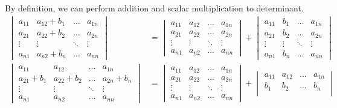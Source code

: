\documentclass{huhtakm-template-book}
\begin{document}
\begin{defn}
    By definition, we can perform addition and scalar multiplication to determinant.
    \begin{align*}
        \begin{vmatrix}
            a_{11} & a_{12}+b_{1} & \hdots & a_{1n}\\
            a_{21} & a_{22}+b_{2} & \hdots & a_{2n}\\
            \vdots & \vdots & \ddots & \vdots\\
            a_{n1} & a_{n2}+b_{n} & \hdots & a_{nn}
        \end{vmatrix}&=\begin{vmatrix}
            a_{11} & a_{12} & \hdots & a_{1n}\\
            a_{21} & a_{22} & \hdots & a_{2n}\\
            \vdots & \vdots & \ddots & \vdots\\
            a_{n1} & a_{n2} & \hdots & a_{nn}
        \end{vmatrix}+\begin{vmatrix}
            a_{11} & b_{1} & \hdots & a_{1n}\\
            a_{21} & b_{2} & \hdots & a_{2n}\\
            \vdots & \vdots & \ddots & \vdots\\
            a_{n1} & b_{n} & \hdots & a_{nn}
        \end{vmatrix}\\
        \begin{vmatrix}
            a_{11} & a_{12} & \hdots & a_{1n}\\
            a_{21}+b_{1} & a_{22}+b_{2} & \hdots & a_{2n}+b_{n}\\
            \vdots & \vdots & \ddots & \vdots\\
            a_{n1} & a_{n2} & \hdots & a_{nn}
        \end{vmatrix}&=\begin{vmatrix}
            a_{11} & a_{12} & \hdots & a_{1n}\\
            a_{21} & a_{22} & \hdots & a_{2n}\\
            \vdots & \vdots & \ddots & \vdots\\
            a_{n1} & a_{n2} & \hdots & a_{nn}
        \end{vmatrix}+\begin{vmatrix}
            a_{11} & a_{12} & \hdots & a_{1n}\\
            b_{1} & b_{2} & \hdots & b_{n}\\

\end{vmatrix}
\end{align*}
\end{defn}
\end{document}
